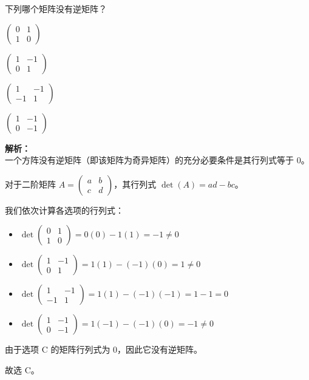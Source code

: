 \documentclass[12pt,a4paper]{exam-zh}
\begin{document}
\begin{question}
    下列哪个矩阵没有逆矩阵？
    \begin{choices}
        \item $\begin{pmatrix}0&1\\1&0\end{pmatrix}$
        \item $\begin{pmatrix}1&-1\\0&1\end{pmatrix}$
        \item $\begin{pmatrix}1&-1\\-1&1\end{pmatrix}$
        \item $\begin{pmatrix}1&-1\\0&-1\end{pmatrix}$
    \end{choices}
\end{question}
\begin{solution}
    \textbf{解析：} \\
    一个方阵没有逆矩阵（即该矩阵为奇异矩阵）的充分必要条件是其行列式等于 0。
    
    对于二阶矩阵 $A = \begin{pmatrix}a&b\\c&d\end{pmatrix}$，其行列式 $\det(A) = ad - bc$。
    
    我们依次计算各选项的行列式：
    \begin{itemize}
        \item[A.] $\det\begin{pmatrix}0&1\\1&0\end{pmatrix} = 0(0) - 1(1) = -1 \neq 0$
        \item[B.] $\det\begin{pmatrix}1&-1\\0&1\end{pmatrix} = 1(1) - (-1)(0) = 1 \neq 0$
        \item[C.] $\det\begin{pmatrix}1&-1\\-1&1\end{pmatrix} = 1(1) - (-1)(-1) = 1 - 1 = 0$
        \item[D.] $\det\begin{pmatrix}1&-1\\0&-1\end{pmatrix} = 1(-1) - (-1)(0) = -1 \neq 0$
    \end{itemize}
    
    由于选项 C 的矩阵行列式为 0，因此它没有逆矩阵。
    
    故选 C。
\end{solution}
\end{document}
